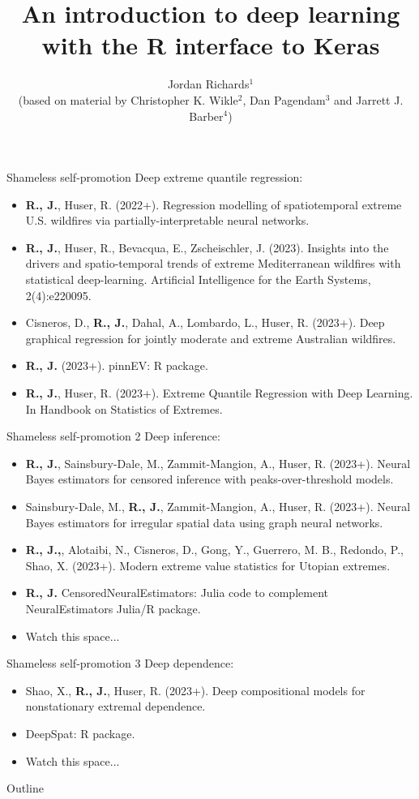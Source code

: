 \documentclass{beamer}
\title[cde-Rkeras-intro]{An introduction to deep learning with the R interface to Keras}
\author[Jordan Richards]{Jordan Richards$^1$\\ (based on material by Christopher K. Wikle$^2$, Dan Pagendam$^3$ and Jarrett J. Barber$^4$) }
\institute[KAUST]{$^1$King Abdullah University of Science and Technology (KAUST)\\
($^2$University of Missouri, $^3$CSIRO Data61, Brisbane, Australia, $^4$Northern Arizona University)}
\date{}
\begin{document}
\maketitle
\begin{frame}{Shameless self-promotion}
Deep extreme quantile regression:
\begin{itemize}
\item \textbf{R., J.}, Huser, R. (2022+). Regression modelling of spatiotemporal extreme U.S. wildfires via partially-interpretable neural networks. 
\item \textbf{R., J.}, Huser, R., Bevacqua, E., Zscheischler, J. (2023). Insights into the drivers and spatio-temporal trends of extreme Mediterranean wildfires with statistical deep-learning. Artificial Intelligence for the Earth Systems, 2(4):e220095.
\item Cisneros, D., \textbf{R., J.}, Dahal, A., Lombardo, L., Huser, R. (2023+). Deep graphical regression for jointly moderate and extreme Australian wildfires.
\item \textbf{R., J.} (2023+). pinnEV: R package.
\item \textbf{R., J.}, Huser, R. (2023+). Extreme Quantile Regression with Deep Learning. In Handbook on Statistics of Extremes.
\end{itemize}
\end{frame}
\begin{frame}{Shameless self-promotion 2}
Deep inference:
\begin{itemize}
\item \textbf{R., J.}, Sainsbury-Dale, M., Zammit-Mangion, A., Huser, R. (2023+). Neural Bayes estimators for censored inference with peaks-over-threshold models. 
\item Sainsbury-Dale, M., \textbf{R., J.}, Zammit-Mangion, A., Huser, R. (2023+). Neural Bayes estimators for irregular spatial data using graph neural networks.
\item \textbf{R., J.,}, Alotaibi, N., Cisneros, D., Gong, Y., Guerrero, M. B., Redondo, P.,  Shao, X. (2023+). Modern extreme value statistics for Utopian extremes.
\item \textbf{R., J.} CensoredNeuralEstimators: Julia code to complement NeuralEstimators Julia/R package.
\item Watch this space...
\end{itemize}
\end{frame}

\begin{frame}{Shameless self-promotion 3}
Deep dependence:
\begin{itemize}
\item Shao, X., \textbf{R., J.}, Huser, R. (2023+). Deep compositional models for nonstationary extremal dependence.
\item DeepSpat: R package.
\item Watch this space...
\end{itemize}
\end{frame}
\begin{frame}{Outline}
\tableofcontents
\end{frame}
\end{document}
